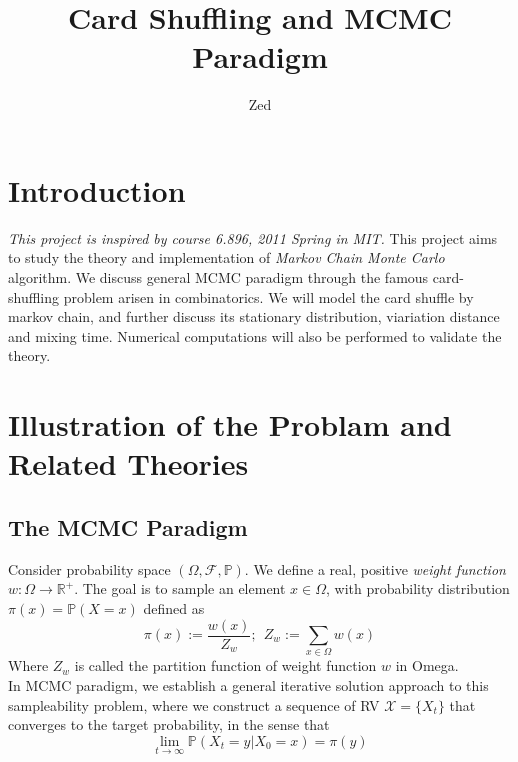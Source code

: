 \documentclass[a4paper, 11pt]{article}
\title{Card Shuffling and MCMC Paradigm}
\author{Zed}
\theoremstyle{definition}
\begin{document}
\maketitle
\section{Introduction}
\textit{This project is inspired by course 6.896, 2011 Spring in MIT.}\cite{mit} 
This project aims to study the theory and implementation of \textit{Markov Chain Monte Carlo} algorithm. We discuss general MCMC paradigm through the famous card-shuffling problem arisen in combinatorics. We will model the card shuffle by markov chain, and further discuss its stationary distribution, viariation distance and mixing time. Numerical computations will also be performed to validate the theory.

\section{Illustration of the Problam and Related Theories}
\subsection{The MCMC Paradigm} 
Consider probability space $(\Omega, \mathcal{F}, \mathbb{P})$. We define a real, positive \textit{weight function} $w:\Omega \to \mathbb{R}^+$. The goal is to sample an element $x\in\Omega$, with probability distribution $\pi(x)=\mathbb{P}\left(X=x\right)$ defined as
$$\pi(x):=\frac{w(x)}{Z_w};~~Z_w:=\sum_{x\in\Omega}w(x)$$
Where $Z_w$ is called the partition function of weight function $w$ in Omega. \\
In MCMC paradigm, we establish a general iterative solution approach to this sampleability problem, where we construct a sequence of RV $\mathcal{X}=\{X_t\}$ that converges to the target probability, in the sense that
$$
\lim\limits_{t\to \infty} \mathbb{P}\left(X_t=y|X_0=x\right) = \pi(y)
$$
\end{document}
